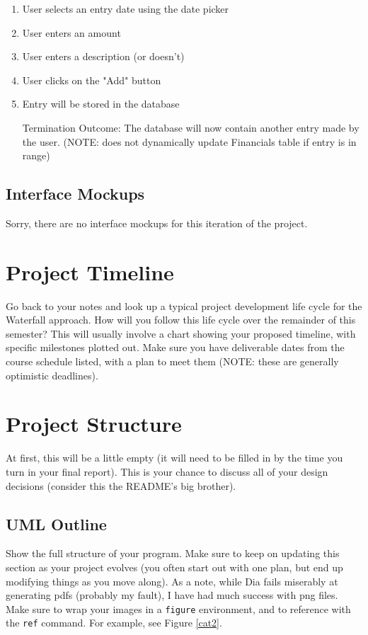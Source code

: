 \documentclass[10pt,conference,onecolumn,compsoc]{IEEEtran}
\begin{document}
\begin{enumerate}
\item User selects an entry date using the date picker
\item User enters an amount
\item User enters a description (or doesn't)
\item User clicks on the "Add" button
\item Entry will be stored in the database
\item[Termination Outcome:] The database will now contain another entry made by the user. (NOTE: does not dynamically update Financials table if entry is in range)
\end{enumerate}


\subsection{Interface Mockups}
Sorry, there are no interface mockups for this iteration of the project.

\section{Project Timeline}
Go back to your notes and look up a typical project development life cycle for the Waterfall approach.  How will you follow this life cycle over the remainder of this semester?  This will usually involve a chart showing your proposed timeline, with specific milestones plotted out.  Make sure you have deliverable dates from the course schedule listed, with a plan to meet them (NOTE: these are generally optimistic deadlines).

\section{Project Structure}
At first, this will be a little empty (it will need to be filled in by the time you turn in your final report).  This is your chance to discuss all of your design decisions (consider this the README's big brother).

\subsection{UML Outline}
Show the full structure of your program.  Make sure to keep on updating this section as your project evolves (you often start out with one plan, but end up modifying things as you move along).  As a note, while Dia fails miserably at generating pdfs (probably my fault), I have had much success with png files.  Make sure to wrap your images in a \texttt{figure} environment, and to reference with the \texttt{ref} command.  For example, see Figure \ref{cat2}.
\end{document}
